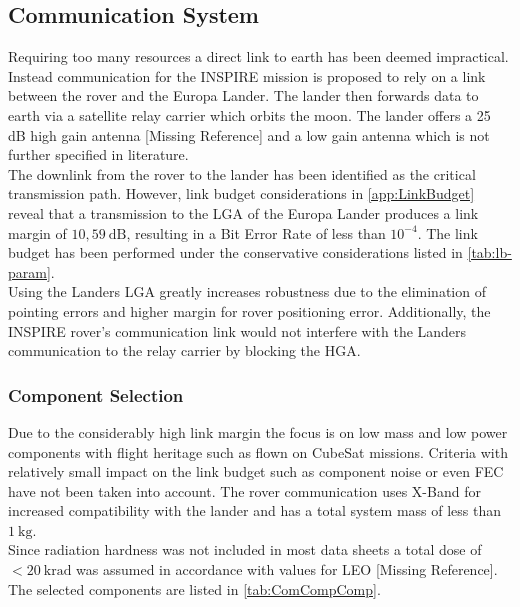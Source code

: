 \subsection{Communication System}
Requiring too many resources a direct link to earth has been deemed impractical. Instead communication for the INSPIRE mission is proposed to rely on a link between the rover and the Europa Lander. The lander then forwards data to earth via a satellite relay carrier which orbits the moon. The lander offers a 25 dB high gain antenna [Missing Reference] and a low gain antenna which is not further specified in literature.\\

The downlink from the rover to the lander has been identified as the critical transmission path. However, link budget considerations in \autoref{app:LinkBudget} reveal that a transmission to the LGA of the Europa Lander produces a link margin of $10,59~\text{dB}$, resulting in a Bit Error Rate of less than $10^{-4}$. The link budget has been performed under the conservative considerations listed in \autoref{tab:lb-param}.\\

Using the Landers LGA greatly increases robustness due to the elimination of pointing errors and higher margin for rover positioning error. Additionally, the INSPIRE rover’s communication link would not interfere with the Landers communication to the relay carrier by blocking the HGA.

\subsubsection{Component Selection}

Due to the considerably high link margin the focus is on low mass and low power components with flight heritage such as flown on CubeSat missions. Criteria with relatively small impact on the link budget such as component noise or even FEC have not been taken into account. The rover communication uses X-Band for increased compatibility with the lander and has a total system mass of less than $1~\text{kg}$. \\
Since radiation hardness was not included in most data sheets a total dose of $<20~\text{krad}$ was assumed in accordance with values for LEO [Missing Reference]. \\

The selected components are listed in \autoref{tab:ComCompComp}. 

